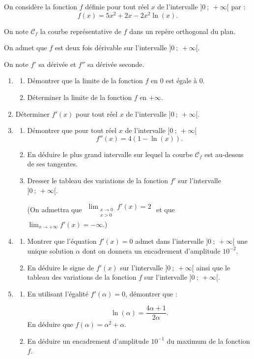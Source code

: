 \medskip

On considère la fonction $f$ définie pour tout réel $x$ de l'intervalle $]0~;~+\infty[$  par :
\[f(x) = 5x^2 + 2x - 2x^2\ln (x).\]

On note $\mathcal{C}_f$ la courbe représentative de $f$ dans un repère orthogonal du plan.

On admet que $f$ est deux fois dérivable sur l'intervalle $]0~;~+\infty[$.

On note $f'$ sa dérivée et $f''$ sa dérivée seconde.

\medskip

\begin{enumerate}
\item 
	\begin{enumerate}
		\item Démontrer que la limite de la fonction $f$ en $0$ est égale à $0$.
		\item Déterminer la limite de la fonction $f$ en $+ \infty$.
	\end{enumerate}
\item Déterminer $f'(x)$ pour tout réel $x$ de l'intervalle $]0~;~+\infty[$.
\item 
	\begin{enumerate}
		\item Démontrer que pour tout réel $x$ de l'intervalle $]0~;~+\infty[$
\[f''(x) = 4(1 - \ln (x)).\]
		\item En déduire le plus grand intervalle sur lequel la courbe $\mathcal{C}_f$ est au-dessus de ses tangentes.
		\item Dresser le tableau des variations de la fonction $f'$ sur l'intervalle $]0~;~+\infty[$.

(On admettra que $\begin{gathered}\displaystyle\lim_{\substack{x \to 0\\x>0}} f'(x) = 2\end{gathered}$ et que $\displaystyle\lim_{x \to + \infty} f'(x) = - \infty$.)
	\end{enumerate}	
\item 
	\begin{enumerate}
		\item Montrer que l'équation $f'(x) = 0$ admet dans l'intervalle $]0~;~+\infty[$ une unique solution $\alpha$ dont on donnera un encadrement d'amplitude $10^{-2}$.
		\item En déduire le signe de $f'(x)$ sur l'intervalle $]0~;~+\infty[$ ainsi que le tableau des variations de la fonction $f$ sur l'intervalle $]0~;~+\infty[$.
	\end{enumerate}
\item 
	\begin{enumerate}
		\item En utilisant l'égalité $f'(\alpha) = 0$, démontrer que : 
		
\[\ln (\alpha) = \dfrac{4\alpha + 1}{2\alpha}.\]
 En déduire que $f(\alpha) = \alpha^2 + \alpha$.
		\item En déduire un encadrement d'amplitude $10^{-1}$ du maximum de la fonction $f$.
	\end{enumerate}
\end{enumerate}
